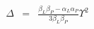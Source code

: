 \begin{eqnarray}
  \Delta &=& \frac{\beta_{L} \beta_{P} - \alpha_{L} \alpha_{P}}{3\beta_{L} \beta_{P}} \varUpsilon^{2}
\end{eqnarray}
